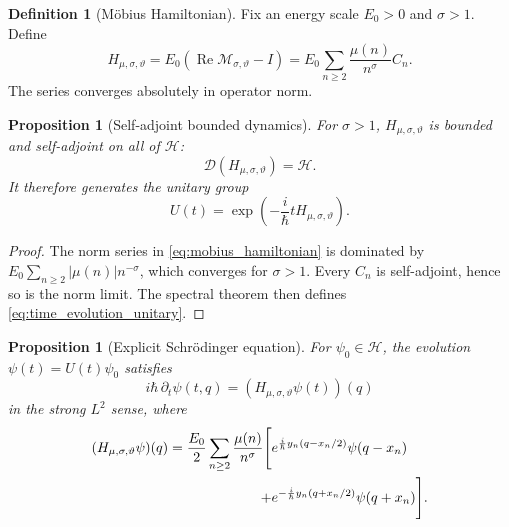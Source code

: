 \documentclass[11pt]{amsart}
\numberwithin{equation}{section}
\theoremstyle{plain}
\newtheorem{proposition}[theorem]{Proposition}
\theoremstyle{definition}
\newtheorem{definition}[theorem]{Definition}
\theoremstyle{remark}
\newcommand{\Hil}{\mathcal{H}}
\newcommand{\Dom}{\mathcal{D}}
\newcommand{\Reop}{\operatorname{Re}}
\begin{document}
\begin{definition}[M\"obius Hamiltonian]
\label{def:mobius_hamiltonian}
Fix an energy scale $E_0>0$ and $\sigma>1$.  Define
\begin{equation}
H_{\mu,\sigma,\vartheta}
=
E_0\left(\Reop\mathcal M_{\sigma,\vartheta}-I\right)
=
E_0\sum_{n\ge2}
\frac{\mu(n)}{n^{\sigma}}C_n.
\label{eq:mobius_hamiltonian}
\end{equation}
The series converges absolutely in operator norm.
\end{definition}

\begin{proposition}[Self-adjoint bounded dynamics]
\label{prop:hamiltonian_selfadjoint}
For $\sigma>1$, $H_{\mu,\sigma,\vartheta}$ is bounded and self-adjoint on
all of $\Hil$:
\begin{equation}
\Dom(H_{\mu,\sigma,\vartheta})=\Hil.
\label{eq:hamiltonian_domain}
\end{equation}
It therefore generates the unitary group
\begin{equation}
U(t)=\exp\!\left(-\frac{i}{\hbar}tH_{\mu,\sigma,\vartheta}\right).
\label{eq:time_evolution_unitary}
\end{equation}
\end{proposition}

\begin{proof}
The norm series in \eqref{eq:mobius_hamiltonian} is dominated by
$E_0\sum_{n\ge2}|\mu(n)|n^{-\sigma}$, which converges for $\sigma>1$.
Every $C_n$ is self-adjoint, hence so is the norm limit.  The spectral theorem
then defines \eqref{eq:time_evolution_unitary}.
\end{proof}

\begin{proposition}[Explicit Schr\"odinger equation]
\label{prop:schrodinger_equation}
For $\psi_0\in\Hil$, the evolution $\psi(t)=U(t)\psi_0$ satisfies
\begin{equation}
i\hbar\,\partial_t\psi(t,q)
=
(H_{\mu,\sigma,\vartheta}\psi(t))(q)
\label{eq:schrodinger_equation}
\end{equation}
in the strong $L^2$ sense, where
\begin{align}
(H_{\mu,\sigma,\vartheta}\psi)(q)
=
\frac{E_0}{2}
\sum_{n\ge2}
\frac{\mu(n)}{n^{\sigma}}
\Bigg[
& e^{\frac{i}{\hbar}y_n(q-x_n/2)}\psi(q-x_n)
\notag\\
+{}&e^{-\frac{i}{\hbar}y_n(q+x_n/2)}\psi(q+x_n)
\Bigg].
\label{eq:hamiltonian_coordinate_action}
\end{align}
\end{proposition}
\end{document}
